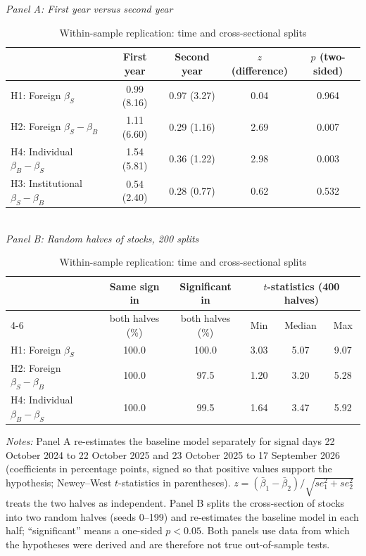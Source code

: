 \begin{table}[htbp]\centering
\caption{Within-sample replication: time and cross-sectional splits}\label{tab:split}
\small
\textit{Panel A: First year versus second year}\\[3pt]
\begin{tabular}{lcccc}\toprule
 & First year & Second year & $z$ (difference) & $p$ (two-sided) \\\midrule
H1: Foreign $\beta_S$ & 0.99 (8.16) & 0.97 (3.27) & 0.04 & 0.964 \\
H2: Foreign $\beta_S-\beta_B$ & 1.11 (6.60) & 0.29 (1.16) & 2.69 & 0.007 \\
H4: Individual $\beta_B-\beta_S$ & 1.54 (5.81) & 0.36 (1.22) & 2.98 & 0.003 \\
H3: Institutional $\beta_S-\beta_B$ & 0.54 (2.40) & 0.28 (0.77) & 0.62 & 0.532 \\
\bottomrule\end{tabular}\\[8pt]
\textit{Panel B: Random halves of stocks, 200 splits}\\[3pt]
\begin{tabular}{lccccc}\toprule
 & Same sign in & Significant in & \multicolumn{3}{c}{$t$-statistics (400 halves)} \\
\cmidrule(lr){4-6}
 & both halves (\%) & both halves (\%) & Min & Median & Max \\\midrule
H1: Foreign $\beta_S$ & 100.0 & 100.0 & 3.03 & 5.07 & 9.07 \\
H2: Foreign $\beta_S-\beta_B$ & 100.0 & 97.5 & 1.20 & 3.20 & 5.28 \\
H4: Individual $\beta_B-\beta_S$ & 100.0 & 99.5 & 1.64 & 3.47 & 5.92 \\
\bottomrule\end{tabular}
\begin{minipage}{0.95\textwidth}\vspace{0.5em}\scriptsize
\textit{Notes:} Panel A re-estimates the baseline model separately for signal days 22 October 2024 to 22 October 2025 and 23 October 2025 to 17 September 2026 (coefficients in percentage points, signed so that positive values support the hypothesis; Newey--West $t$-statistics in parentheses). $z=(\bar\beta_1-\bar\beta_2)/\sqrt{se_1^2+se_2^2}$ treats the two halves as independent. Panel B splits the cross-section of stocks into two random halves (seeds 0--199) and re-estimates the baseline model in each half; ``significant'' means a one-sided $p<0.05$. Both panels use data from which the hypotheses were derived and are therefore not true out-of-sample tests.
\end{minipage}\end{table}